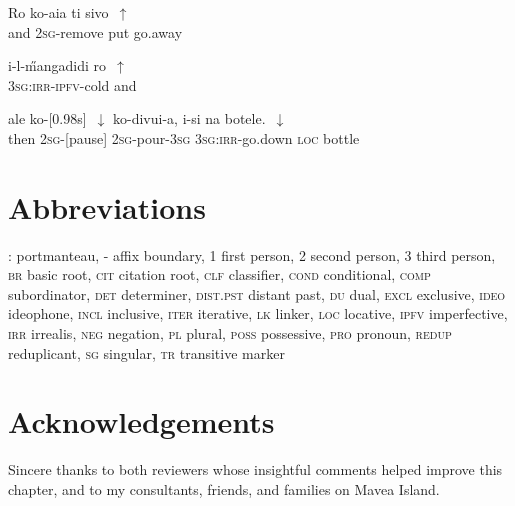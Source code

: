 \documentclass[output=paper]{LSP/langsci}
\begin{document}
  \begin{exe}
\ex \label{Guapp25}
\gll     Ro     ko-aia         ti    sivo~$\uparrow$    \\     	       
 and   \textsc{2sg}-remove   put   go.away \\
\glt {} 
\end{exe}

  \begin{exe}
\ex \label{Guapp26}
\gll    i-l-\H{m}angadidi               ro~$\uparrow$  \\     	       
 \textsc{3sg:irr-ipfv}-cold        and\\
\glt {} 
\end{exe}

  \begin{exe}
\ex \label{Guapp27}
\gll   ale    ko-[0.98s]~$\downarrow$      ko-divui-a,  i-si                 na   botele.~$\downarrow$  \\     	       
 then   \textsc{2sg}-[pause]      \textsc{2sg}-pour-\textsc{3sg}  \textsc{3sg:irr}-go.down   \textsc{loc}  bottle\\
\glt {} 
\end{exe}



\section*{Abbreviations}
\textsc{:} portmanteau,
\textsc{-} affix boundary,
\textsc{1}		first person,
\textsc{2}		second person,
\textsc{3} 		third person,
\textsc{br}		basic root,
\textsc{cit}		citation root,
\textsc{clf}		classifier,
\textsc{cond}		conditional,
\textsc{comp}		subordinator,
\textsc{det}		determiner,
\textsc{dist.pst}		distant past,
\textsc{du}		dual,
\textsc{excl}		exclusive,
\textsc{ideo}		ideophone,
\textsc{incl}		inclusive,
\textsc{iter}		iterative,
\textsc{lk}		linker,
\textsc{loc}		locative,
\textsc{ipfv}		imperfective,
\textsc{irr} 		irrealis,
\textsc{neg} 		negation,
\textsc{pl} 		plural,
\textsc{poss} 		possessive,
\textsc{pro} 		pronoun,
\textsc{redup} 		reduplicant,
\textsc{sg} 		singular,
\textsc{tr} 		transitive marker




\section*{Acknowledgements}
Sincere thanks to both reviewers whose insightful comments helped improve this chapter, and to my consultants, friends, and families on Mavea Island.

\printbibliography[heading=subbibliography,notkeyword=this] 
\end{document}
